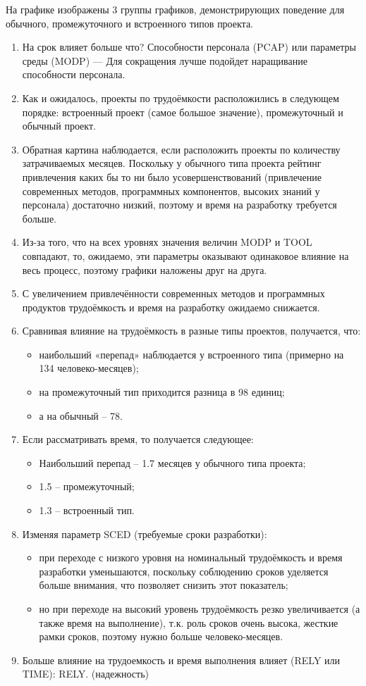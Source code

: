 На графике изображены 3 группы графиков, демонстрирующих поведение для обычного, промежуточного и встроенного типов проекта. 

\begin{enumerate}
	\item На срок влияет больше что? Способности персонала (PCAP) или параметры среды (MODP) --- Для сокращения лучше подойдет наращивание способности персонала.
	\item Как и ожидалось, проекты по трудоёмкости расположились в следующем порядке: встроенный проект (самое большое значение), 
	промежуточный и обычный проект.
	\item Обратная картина наблюдается, если расположить проекты по количеству затрачиваемых месяцев. 
	Поскольку у обычного типа проекта рейтинг привлечения каких бы то ни было усовершенствований (привлечение современных методов, программных компонентов, высоких знаний у персонала) достаточно низкий, поэтому и время на разработку требуется больше.
	\item 	 Из-за того, что на всех уровнях значения величин MODP и TOOL совпадают, то, ожидаемо, эти параметры оказывают одинаковое влияние на весь процесс, поэтому графики наложены друг на друга.
	\item С увеличением привлечённости современных методов и программных продуктов трудоёмкость и время на разработку ожидаемо снижается.
	\item Сравнивая влияние на трудоёмкость в разные типы проектов, получается, что:
		\begin{itemize}
			\item наибольший «перепад» наблюдается у встроенного типа (примерно на 134 человеко-месяцев);
			\item на промежуточный тип приходится разница в 98 единиц;
			\item а на обычный – 78.
		\end{itemize}
	\item Если рассматривать время, то получается следующее:
		\begin{itemize}
			\item Наибольший перепад – 1.7 месяцев у обычного типа проекта;
			\item 1.5 – промежуточный;
			\item 1.3 – встроенный тип.
		\end{itemize}
	\item Изменяя параметр SCED (требуемые сроки разработки):
		\begin{itemize}
			\item при переходе с низкого уровня на номинальный трудоёмкость и время разработки уменьшаются, поскольку соблюдению сроков уделяется больше внимания, что позволяет снизить этот показатель;
			\item но при переходе на высокий уровень трудоёмкость резко увеличивается (а также время на выполнение), т.к. роль сроков очень высока, жесткие рамки сроков, поэтому нужно больше человеко-месяцев.
		\end{itemize}
	\item Больше влияние на трудоемкость и время выполнения влияет (RELY или TIME): RELY. (надежность)
\end{enumerate}

